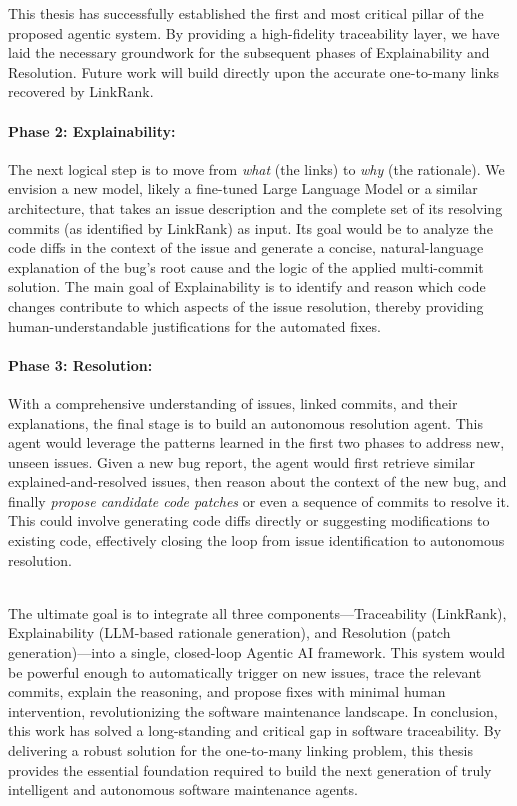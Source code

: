 This thesis has successfully established the first and most critical pillar of the proposed agentic system. By providing a high-fidelity traceability layer, we have laid the necessary groundwork for the subsequent phases of Explainability and Resolution. Future work will build directly upon the accurate one-to-many links recovered by LinkRank.

    \paragraph{Phase 2: Explainability:} The next logical step is to move from \textit{what} (the links) to \textit{why} (the rationale). We envision a new model, likely a fine-tuned Large Language Model or a similar architecture, that takes an issue description and the complete set of its resolving commits (as identified by LinkRank) as input. Its goal would be to analyze the code diffs in the context of the issue and generate a concise, natural-language explanation of the bug's root cause and the logic of the applied multi-commit solution. The main goal of Explainability is to identify and reason which code changes contribute to which aspects of the issue resolution, thereby providing human-understandable justifications for the automated fixes.

    \paragraph{Phase 3: Resolution:} With a comprehensive understanding of issues, linked commits, and their explanations, the final stage is to build an autonomous resolution agent. This agent would leverage the patterns learned in the first two phases to address new, unseen issues. Given a new bug report, the agent would first retrieve similar explained-and-resolved issues, then reason about the context of the new bug, and finally \emph{propose candidate code patches} or even a sequence of commits to resolve it. This could involve generating code diffs directly or suggesting modifications to existing code, effectively closing the loop from issue identification to autonomous resolution.


\noindent
\\The ultimate goal is to integrate all three components---Traceability (LinkRank), Explainability (LLM-based rationale generation), and Resolution (patch generation)---into a single, closed-loop Agentic AI framework. This system would be powerful enough to automatically trigger on new issues, trace the relevant commits, explain the reasoning, and propose fixes with minimal human intervention, revolutionizing the software maintenance landscape. In conclusion, this work has solved a long-standing and critical gap in software traceability. By delivering a robust solution for the one-to-many linking problem, this thesis provides the essential foundation required to build the next generation of truly intelligent and autonomous software maintenance agents.
